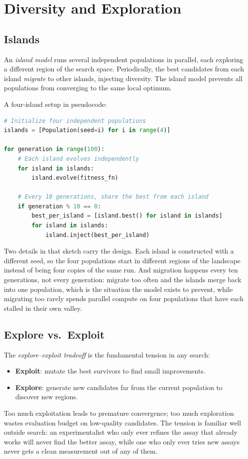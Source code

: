 \section{Diversity and Exploration}
\label{section:Diversity}

\subsection{Islands}

An \emph{island model} runs several independent populations in parallel, each exploring a different region of the search space.
Periodically, the best candidates from each island \emph{migrate} to other islands, injecting diversity.
The island model prevents all populations from converging to the same local optimum.

\begin{example}
A four-island setup in pseudocode:
\begin{lstlisting}[language=python]
# Initialize four independent populations
islands = [Population(seed=i) for i in range(4)]

for generation in range(100):
    # Each island evolves independently
    for island in islands:
        island.evolve(fitness_fn)

    # Every 10 generations, share the best from each island
    if generation % 10 == 0:
        best_per_island = [island.best() for island in islands]
        for island in islands:
            island.inject(best_per_island)
\end{lstlisting}
Two details in that sketch carry the design.
Each island is constructed with a different seed, so the four populations start in different regions of the landscape instead of being four copies of the same run.
And migration happens every ten generations, not every generation: migrate too often and the islands merge back into one population, which is the situation the model exists to prevent, while migrating too rarely spends parallel compute on four populations that have each stalled in their own valley.
\end{example}

\subsection{Explore vs.\ Exploit}

The \emph{explore–exploit tradeoff} is the fundamental tension in any search:
\begin{itemize}
\item \textbf{Exploit}: mutate the best survivors to find small improvements.
\item \textbf{Explore}: generate new candidates far from the current population to discover new regions.
\end{itemize}
Too much exploitation leads to premature convergence; too much exploration wastes evaluation budget on low-quality candidates.
The tension is familiar well outside search: an experimentalist who only ever refines the assay that already works will never find the better assay, while one who only ever tries new assays never gets a clean measurement out of any of them.

